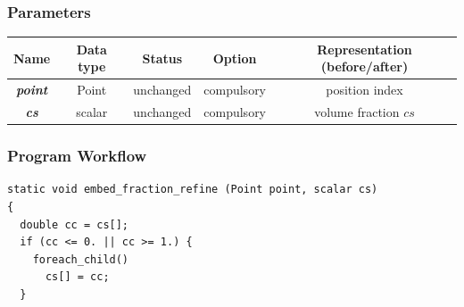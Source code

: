 \documentclass[a4paper]{article}
\newcommand{\para}[1]{\textbf{\emph{\textcolor{para}{#1}}}}
\begin{document}
\subsubsection{Parameters}
\hfill
\begin{table}[h]
  \centering
  \begin{tabular}{|c|c|c|c|c|}
    \hline
    Name & Data type & Status & Option & Representation (before/after)\\[0.5ex]
    \hline\hline
    \para{point} & Point & unchanged & compulsory & position index\\
    \hline
    \para{cs} & scalar & unchanged & compulsory & volume fraction $cs$\\
    \hline
  \end{tabular}
\end{table}

\subsubsection{Program Workflow}
\vspace{1mm}
\begin{multicols}{2}
 \columnbreak
 \begin{verbatim}
static void embed_fraction_refine (Point point, scalar cs)
{
  double cc = cs[];
  if (cc <= 0. || cc >= 1.) {
    foreach_child()
      cs[] = cc;
  }
 \end{verbatim}
\end{multicols}

\begin{center}
\end{center}
\end{document}
